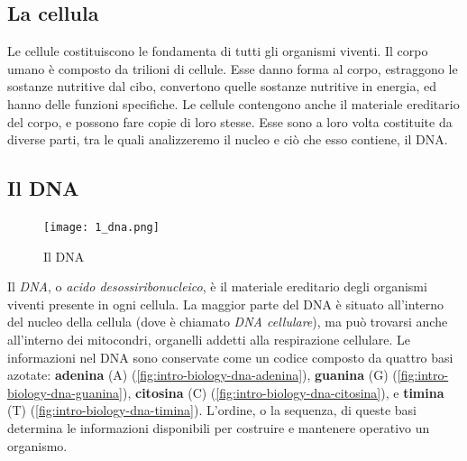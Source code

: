 \subsection{La cellula}
\label{chap:intro-biology-cell}

Le cellule costituiscono le fondamenta di tutti gli organismi viventi. Il corpo umano è composto da trilioni di cellule. Esse danno forma al corpo, estraggono le sostanze nutritive dal cibo, convertono quelle sostanze nutritive in energia, ed hanno delle funzioni specifiche. Le cellule contengono anche il materiale ereditario del corpo, e possono fare copie di loro stesse. Esse sono a loro volta costituite da diverse parti, tra le quali analizzeremo il nucleo e ciò che esso contiene, il DNA.

\subsection{Il DNA}
\label{chap:intro-biology-dna}

\begin{figure}
    \centering
    \texttt{[image: 1\_dna.png]}
    \caption{Il DNA}
    \label{fig:intro-biology-dna}
\end{figure}

Il \textit{DNA}, o \textit{acido desossiribonucleico}, è il materiale ereditario degli organismi viventi presente in ogni cellula. La maggior parte del DNA è situato all'interno del nucleo della cellula (dove è chiamato \textit{DNA cellulare}), ma può trovarsi anche all'interno dei mitocondri, organelli addetti alla respirazione cellulare. Le informazioni nel DNA sono conservate come un codice composto da quattro basi azotate: \textbf{adenina} (A) (\autoref{fig:intro-biology-dna-adenina}), \textbf{guanina} (G) (\autoref{fig:intro-biology-dna-guanina}), \textbf{citosina} (C) (\autoref{fig:intro-biology-dna-citosina}), e \textbf{timina} (T) (\autoref{fig:intro-biology-dna-timina}). L'ordine, o la sequenza, di queste basi determina le informazioni disponibili per costruire e mantenere operativo un organismo.

